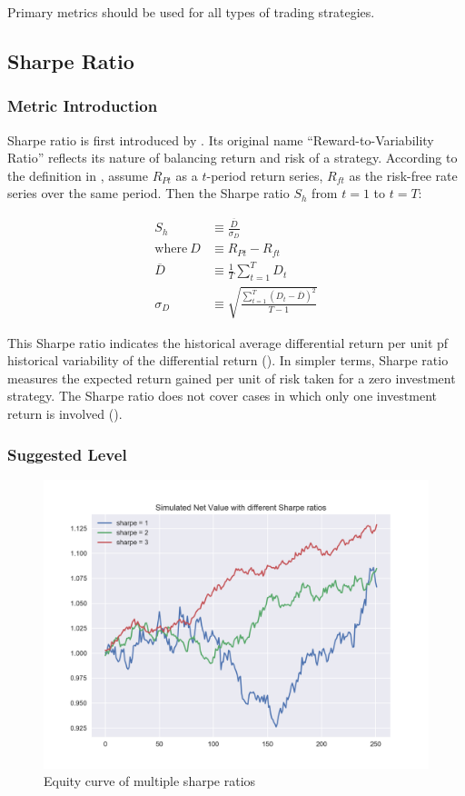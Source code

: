 \documentclass[12pt]{article}
\begin{document}
Primary metrics should be used for all types of trading strategies.

\subsection{Sharpe Ratio}

\subsubsection*{Metric Introduction}

Sharpe ratio is first introduced by \cite{sharpe1966}. Its original name \enquote{Reward-to-Variability Ratio} reflects its nature of balancing return and risk of a strategy. According to the definition in \cite{sharpe1994}, assume \(R_{Pt}\) as a \(t\)-period return series, \(R_{ft}\) as the risk-free rate series over the same period. Then the Sharpe ratio \(S_h\) from \(t=1\) to \(t=T\):

\begin{align*}
  S_h &\equiv \frac{\overline{D}}{\sigma_D} \\
  \text{where}~D &\equiv R_{Pt} - R_{ft} \\
  \overline{D} &\equiv \frac{1}{T} \sum_{t=1}^T D_t \\
  \sigma_D &\equiv \sqrt{\frac{\sum_{t=1}^T (D_t-\overline{D})^2}{T-1}}
\end{align*}

This Sharpe ratio indicates the historical average differential return per unit pf historical variability of the differential return (\cite{sharpe1966}). In simpler terms, Sharpe ratio measures the expected return gained per unit of risk taken for a zero investment strategy. The Sharpe ratio does not cover cases in which only one investment return is involved (\cite{sharpe1994}).

\subsubsection*{Suggested Level}

\begin{figure}[h!]
  \centering
  \includegraphics[scale=0.78]{./ref/figure/sharpe_nav_1200.png}
  \caption{Equity curve of multiple sharpe ratios}
  \label{fig:sharpe_navs}
\end{figure}
\end{document}

